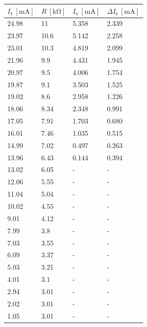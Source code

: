\documentclass[paper=a4, fontsize=12pt]{scrartcl}
\begin{document}
\begin{table}[h!]
	\begin{tabular}{|l|l|l|l|}
		\hline
		$I_\mathrm{ż}\:[\mathrm{mA}]$ & $R\:[\mathrm{k\Omega}]$ & $I_a\:[\mathrm{mA}]$ & $\Delta I_\mathrm{ż}\:[\mathrm{mA}]$ \\ \hline
		24.98 & 11   & 5.358 & 2.339 \\ \hline
		23.97 & 10.6 & 5.142 & 2.258 \\ \hline
		23.01 & 10.3 & 4.819 & 2.099 \\ \hline
		21.96 & 9.9  & 4.431 & 1.945 \\ \hline
		20.97 & 9.5  & 4.006 & 1.754 \\ \hline
		19.87 & 9.1  & 3.503 & 1.525 \\ \hline
		19.02 & 8.6  & 2.958 & 1.226 \\ \hline
		18.06 & 8.34 & 2.348 & 0.991 \\ \hline
		17.05 & 7.91 & 1.703 & 0.680 \\ \hline
		16.01 & 7.46 & 1.035 & 0.515 \\ \hline
		14.99 & 7.02 & 0.497 & 0.263 \\ \hline
		13.96 & 6.43 & 0.144 & 0.394 \\ \hline
		13.02 & 6.05 & -     & -     \\ \hline
		12.06 & 5.55 & -     & -     \\ \hline
		11.04 & 5.04 & -     & -     \\ \hline
		10.02 & 4.55 & -     & -     \\ \hline
		9.01  & 4.12 & -     & -     \\ \hline
		7.99  & 3.8  & -     & -     \\ \hline
		7.03  & 3.55 & -     & -     \\ \hline
		6.09  & 3.37 & -     & -     \\ \hline
		5.03  & 3.21 & -     & -     \\ \hline
		4.01  & 3.1  & -     & -     \\ \hline
		2.94  & 3.01 & -     & -     \\ \hline
		2.02  & 3.01 & -     & -     \\ \hline
		1.05  & 3.01 & -     & -     \\ \hline
	\end{tabular}
\end{table}\clearpage
\end{document}
